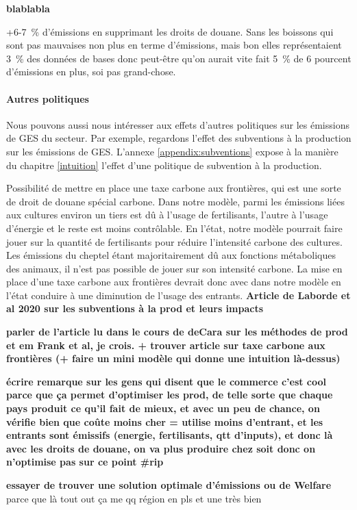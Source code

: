\textbf{blablabla}

+6-7~\% d'émissions en supprimant les droits de douane. Sans les boissons qui sont pas mauvaises non plus en terme d'émissions, mais bon elles représentaient 3~\% des données de bases donc peut-être qu'on aurait vite fait 5~\% de 6 pourcent d'émissions en plus, soi pas grand-chose.


\paragraph{Autres politiques}\label{Sec_subvention}
Nous pouvons aussi nous intéresser aux effets d'autres politiques sur les émissions de GES du secteur. Par exemple, regardons l'effet des subventions à la production sur les émissions de GES. L'annexe \ref{appendix:subventions} expose à la manière du chapitre \ref{intuition} l'effet d'une politique de subvention à la production.

Possibilité de mettre en place une taxe carbone aux frontières, qui est une sorte de droit de douane spécial carbone. Dans notre modèle, parmi les émissions liées aux cultures environ un tiers est dû à l'usage de fertilisants, l'autre à l'usage d'énergie et le reste est moins contrôlable. En l'état, notre modèle pourrait faire jouer sur la quantité de fertilisants pour réduire l'intensité carbone des cultures. Les émissions du cheptel étant majoritairement dû aux fonctions métaboliques des animaux, il n'est pas possible de jouer sur son intensité carbone. La mise en place d'une taxe carbone aux frontières devrait donc avec dans notre modèle en l'état conduire à une diminution de l'usage des entrants. \textbf{ Article de Laborde et al 2020 sur les subventions à la prod et leurs impacts}

\textbf{parler de l'article lu dans le cours de deCara sur les méthodes de prod et em Frank et al, je crois. + trouver article sur taxe carbone aux frontières (+ faire un mini modèle qui donne une intuition là-dessus)}


\textbf{écrire remarque sur les gens qui disent que le commerce c'est cool parce que ça permet d'optimiser les prod, de telle sorte que chaque pays produit ce qu'il fait de mieux, et avec un peu de chance, on vérifie bien que coûte moins cher = utilise moins d'entrant, et les entrants sont émissifs (energie, fertilisants, qtt d'inputs), et donc là avec les droits de douane, on va plus produire chez soit donc on n'optimise pas sur ce point \#rip}

\textbf{essayer de trouver une solution optimale d'émissions ou de Welfare} parce que là tout out ça me qq région en pls et une très bien